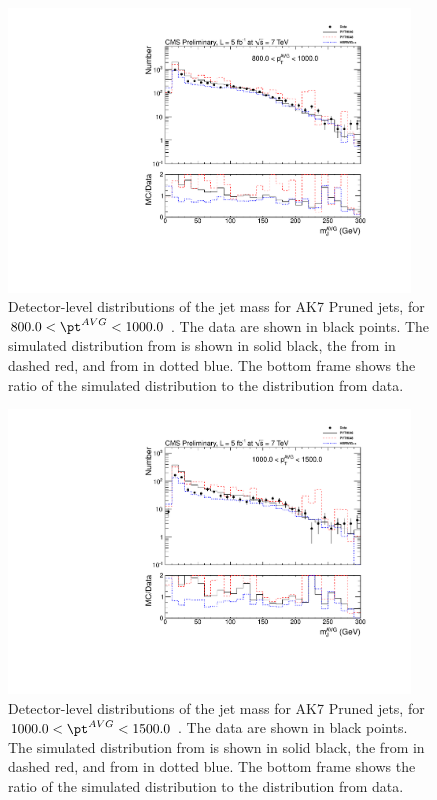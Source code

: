 \begin{figure}[htbp]
\centering
\includegraphics[width=0.95\textwidth]{figs/histAK7MjetVsPtAvg_rawDataMCComparisons_pt_9_Pruned}
\caption{Detector-level distributions of the jet mass for AK7 Pruned jets,
for $800.0 < \pt^{AVG} < 1000.0$ \GeVc. The data are shown in black points.
The simulated distribution from \PYTHIA is shown in solid black, 
the from \PYTHIAEIGHT in dashed red, and from \HERWIG in dotted blue. 
The bottom frame shows the ratio of the simulated distribution
to the distribution from data. 
\label{figs:histAK7MjetVsPtAvg_rawDataMCComparisons_pt_9_Pruned}}
\end{figure}



\begin{figure}[htbp]
\centering
\includegraphics[width=0.95\textwidth]{figs/histAK7MjetVsPtAvg_rawDataMCComparisons_pt_10_Pruned}
\caption{Detector-level distributions of the jet mass for AK7 Pruned jets,
for $1000.0 < \pt^{AVG} < 1500.0$ \GeVc. The data are shown in black points.
The simulated distribution from \PYTHIA is shown in solid black, 
the from \PYTHIAEIGHT in dashed red, and from \HERWIG in dotted blue. 
The bottom frame shows the ratio of the simulated distribution
to the distribution from data. 
\label{figs:histAK7MjetVsPtAvg_rawDataMCComparisons_pt_10_Pruned}}
\end{figure}

\fi

\clearpage
